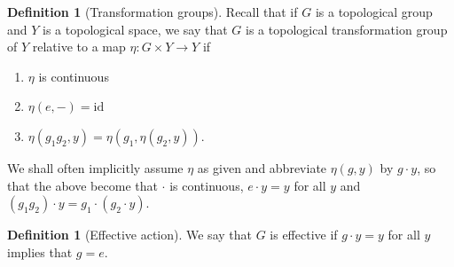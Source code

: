 \documentclass[reqno]{amsart}
\theoremstyle{definition}
\newtheorem{definition}[theorem]{Definition}
\theoremstyle{remark}
\newcommand{\id}{{\mathrm{id}}}
\begin{document}
\begin{definition}[Transformation groups]
    Recall that if $G$ is a topological group and
    $Y$ is a topological space, we say that
    $G$ is a topological transformation group of $Y$ relative
    to a map $\eta \colon G \times Y \to Y$ if
    \begin{enumerate}
        \item $\eta$ is continuous
        \item $\eta (e,-) = \id$ 
        \item $\eta \left( g_1g_2,y \right) 
            = \eta \left( g_1, \eta(g_2,y) \right) $.
    \end{enumerate}
    We shall often implicitly assume $\eta$ as given and
    abbreviate $\eta (g,y)$ by $g\cdot y$, so that the above
    become that $\cdot $ is continuous,
    $e\cdot y =y$ for all $y$ and
    $\left( g_1g_2 \right) \cdot y = g_1\cdot \left( g_2\cdot y
    \right) $.
\end{definition}

\begin{definition}[Effective action]
    We say that $G$ is effective if
    $g \cdot y = y$ for all $y$ implies that
    $g = e$.
\end{definition}
\end{document}
